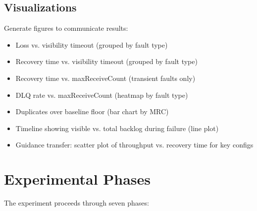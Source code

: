 \subsection{Visualizations}

Generate figures to communicate results:
\begin{itemize}
    \item Loss vs. visibility timeout (grouped by fault type)
    \item Recovery time vs. visibility timeout (grouped by fault type)
    \item Recovery time vs. maxReceiveCount (transient faults only)
    \item DLQ rate vs. maxReceiveCount (heatmap by fault type)
    \item Duplicates over baseline floor (bar chart by MRC)
    \item Timeline showing visible vs. total backlog during failure (line plot)
    \item Guidance transfer: scatter plot of throughput vs. recovery time for key configs
\end{itemize}

\section{Experimental Phases}

The experiment proceeds through seven phases:

